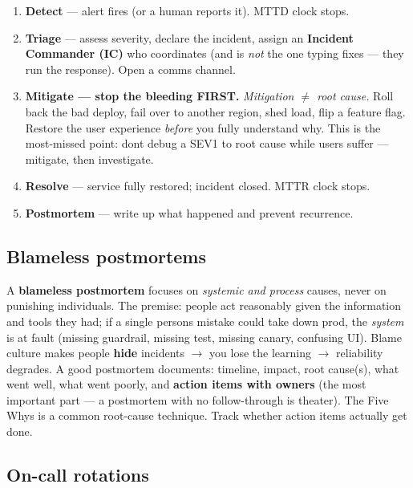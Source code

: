 \documentclass[11pt]{article}
\providecommand{\tightlist}{\setlength{\itemsep}{1pt}\setlength{\parskip}{0pt}}
\begin{document}
\begin{enumerate}
\def\labelenumi{\arabic{enumi}.}
\tightlist
\item
  \textbf{Detect} --- alert fires (or a human reports it). MTTD clock stops.
\item
  \textbf{Triage} --- assess severity, declare the incident, assign an \textbf{Incident Commander (IC)} who coordinates (and is \emph{not} the one typing fixes --- they run the response). Open a comms channel.
\item
  \textbf{Mitigate --- stop the bleeding FIRST.} \emph{Mitigation \(\neq\) root cause.} Roll back the bad deploy, fail over to another region, shed load, flip a feature flag. Restore the user experience \emph{before} you fully understand why. This is the most-missed point: don\textquotesingle t debug a SEV1 to root cause while users suffer --- mitigate, then investigate.
\item
  \textbf{Resolve} --- service fully restored; incident closed. MTTR clock stops.
\item
  \textbf{Postmortem} --- write up what happened and prevent recurrence.
\end{enumerate}

\subsection{Blameless postmortems}\label{blameless-postmortems}

A \textbf{blameless postmortem} focuses on \emph{systemic and process} causes, never on punishing individuals. The premise: people act reasonably given the information and tools they had; if a single person\textquotesingle s mistake could take down prod, the \emph{system} is at fault (missing guardrail, missing test, missing canary, confusing UI). Blame culture makes people \textbf{hide} incidents \(\rightarrow\) you lose the learning \(\rightarrow\) reliability degrades. A good postmortem documents: timeline, impact, root cause(s), what went well, what went poorly, and \textbf{action items with owners} (the most important part --- a postmortem with no follow-through is theater). The Five Whys is a common root-cause technique. Track whether action items actually get done.

\subsection{On-call rotations}\label{on-call-rotations}
\end{document}
